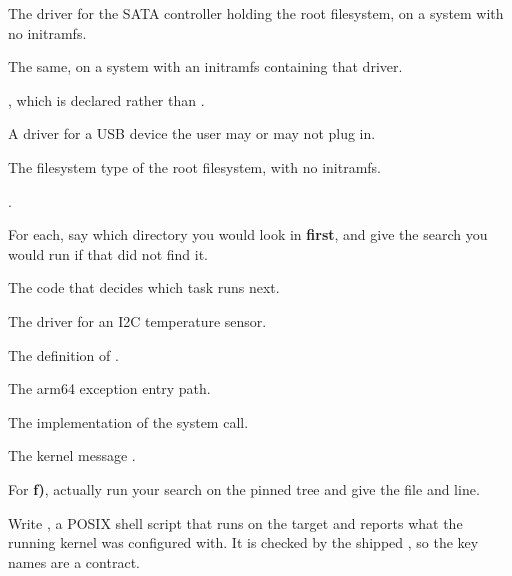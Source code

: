  The driver for the SATA controller holding the root filesystem, on a system with no
initramfs.

 The same, on a system with an initramfs containing that driver.

 , which is declared  rather than .

 A driver for a USB device the user may or may not plug in.

 The filesystem type of the root filesystem, with no initramfs.

 .

\label{c3:ex:5}

For each, say which directory you would look in \textbf{first}, and give the search you would run if
that did not find it.

 The code that decides which task runs next.

 The driver for an I2C temperature sensor.

 The definition of .

 The arm64 exception entry path.

 The implementation of the  system call.

 The kernel message .

For \textbf{f)}, actually run your search on the pinned tree and give the file and line.

\label{c3:ex:6}

Write , a POSIX shell script that runs on the target and
reports what the running kernel was configured with. It is checked by the shipped
, so the key names are a contract.

